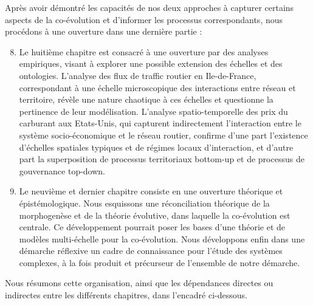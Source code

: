 {\begin{enumerate}
\end{enumerate}
Après avoir démontré les capacités de nos deux approches à capturer certains aspects de la co-évolution et d'informer les processus correspondants, nous procédons à une ouverture dans une dernière partie :
\begin{enumerate}\setcounter{enumi}{7}
	\item Le huitième chapitre est consacré à une ouverture par des analyses empiriques, visant à explorer une possible extension des échelles et des ontologies. L'analyse des flux de traffic routier en Ile-de-France, correspondant à une échelle microscopique des interactions entre réseau et territoire, révèle une nature chaotique à ces échelles et questionne la pertinence de leur modélisation. L'analyse spatio-temporelle des prix du carburant aux Etats-Unis, qui capturent indirectement l'interaction entre le système socio-économique et le réseau routier, confirme d'une part l'existence d'échelles spatiales typiques et de régimes locaux d'interaction, et d'autre part la superposition de processus territoriaux bottom-up et de processus de gouvernance top-down.
	\item Le neuvième et dernier chapitre consiste en une ouverture théorique et épistémologique. Nous esquissons une réconciliation théorique de la morphogenèse et de la théorie évolutive, dans laquelle la co-évolution est centrale. Ce développement pourrait poser les bases d'une théorie et de modèles multi-échelle pour la co-évolution. Nous développons enfin dans une démarche réflexive un cadre de connaissance pour l'étude des systèmes complexes, à la fois produit et précurseur de l'ensemble de notre démarche.
\end{enumerate}
}



Nous résumons cette organisation, ainsi que les dépendances directes ou indirectes entre les différents chapitres, dans l'encadré ci-dessous.


